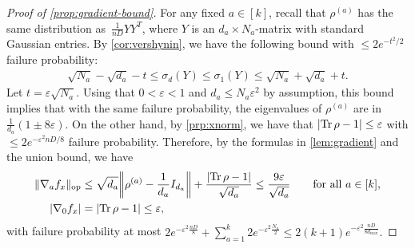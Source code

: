 \documentclass[aos]{imsart}
\theoremstyle{definition}
\numberwithin{equation}{section}
\DeclareMathOperator{\op}{op}
\DeclareMathOperator{\tr}{Tr}
\DeclarePairedDelimiter{\abs}{\lvert}{\rvert}
\DeclarePairedDelimiter{\norm}{\lVert}{\rVert}
\newcommand{\eps}{\varepsilon}
\begin{document}
\begin{proof}[Proof of \cref{prop:gradient-bound}]
For any fixed $a\in[k]$, recall that $\rho^{(a)}$ has the same distribution as~$\frac1{nD} YY^T$, where $Y$ is an $d_a\times N_a$-matrix with standard Gaussian entries.
By \cref{cor:vershynin}, we have the following bound with $\leq 2 e^{-t^2/2}$ failure probability:
\begin{align*}
  \sqrt{N_a} - \sqrt{d_a} - t \leq \sigma_d(Y) \leq \sigma_1(Y) \leq \sqrt{N_a} + \sqrt{d_a} + t.
\end{align*}
Let $t = \eps \sqrt{N_a}$.
Using that $0<\eps<1$ and $d_a \leq N_a \eps^2$ by assumption, this bound implies that
with the same failure probability, the eigenvalues of $\rho^{(a)}$ are in $\frac1{d_a}(1\pm8\eps)$.
On the other hand, by \cref{prp:xnorm}, we have that $\abs{\tr \rho - 1} \leq \eps$ with $\leq 2e^{-\eps^2 nD/8}$ failure probability.
Therefore, by the formulas in \cref{lem:gradient} and the union bound, we have
\begin{align*}
  \norm{\nabla_a f_x}_{\op}
&\leq\sqrt{d_a} \norm*{\rho^{(a)} - \frac1{d_a} I_{d_a}} + \frac{\abs{\tr\rho - 1}}{\sqrt{d_a}}
\leq\frac{9\eps}{\sqrt{d_a}} \qquad \text{for all } a\in[k], \\
  \abs{\nabla_0 f_x}
&=\abs{\tr \rho - 1} \leq \eps,
\end{align*}
with failure probability at most
$2e^{-\eps^2 \frac{nD}8} + \sum_{a=1}^k 2 e^{-\eps^2 \frac{N_a}2}
\leq 2(k+1)e^{-\eps^2 \frac{nD}{8d_{\max}}}.$
\end{proof}
\end{document}
